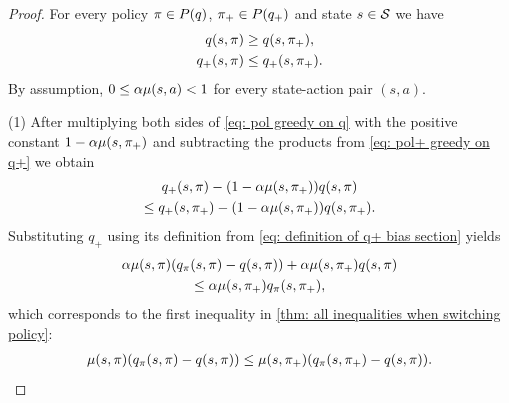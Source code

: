 \vspace{-0.7cm}
\begin{proof}
For every policy $\pi \in P(q)$, $\pi_+ \in P(q_+)$ and state $s \in \mathcal{S}$ we have
\begin{align}
    \label{eq: pol greedy on q}
    q(s, \pi) &\geq q(s, \pi_+) ,
    \\
    \label{eq: pol+ greedy on q+}
    q_+(s, \pi) &\leq q_+(s, \pi_+) .
\end{align}
By assumption, $0 \le \alpha \mu(s,a) < 1$ for every state-action pair $(s,a)$.

(1)
After multiplying both sides of \eqref{eq: pol greedy on q} with the positive constant $ 1 - \alpha \mu(s, \pi_+)$ and
subtracting the products from \eqref{eq: pol+ greedy on q+} we obtain
\begin{multline*}
    q_+(s, \pi) - ( 1 - \alpha \mu(s, \pi_+)) q(s, \pi)
    \\
    \leq q_+(s, \pi_+) - ( 1 - \alpha \mu(s, \pi_+)) q(s, \pi_+) .
\end{multline*}
Substituting $q_+$ using its definition from \eqref{eq: definition of q+ bias section} 
yields
\begin{multline*}
    \alpha \mu(s, \pi)( q_{\pi}(s, \pi) - q(s, \pi) ) + \alpha \mu(s, \pi_+) q(s, \pi)
    \\
    \leq \alpha \mu(s, \pi_+) q_{\pi}(s, \pi_+) ,
\end{multline*}
which corresponds to the first inequality in \autoref{thm: all inequalities when switching policy}:
\begin{align}
\label{eq: ineq on boundary pol pol}
    \mu(s, \pi) ( q_{\pi}(s, \pi) - q(s, \pi) )
    \leq \mu(s, \pi_+)( q_{\pi}(s, \pi_+) - q(s, \pi) ) .
\end{align}


\end{proof}
